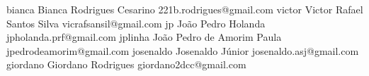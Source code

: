     {bianca}
    {Bianca Rodrigues Cesarino}
    {221b.rodrigues@gmail.com}
    {victor}
    {Victor Rafael Santos Silva}
    {vicrafsansil@gmail.com}
    {jp}
    {João Pedro Holanda}
    {jpholanda.prf@gmail.com}
    {jplinha}
    {João Pedro de Amorim Paula}
    {jpedrodeamorim@gmail.com}
    {josenaldo}
    {Josenaldo Júnior}
    {josenaldo.asj@gmail.com}
    {giordano}
    {Giordano Rodrigues}
    {giordano2dcc@gmail.com}
